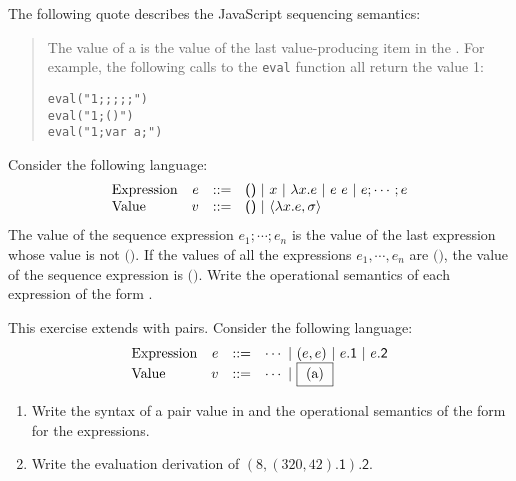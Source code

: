 \begin{exercise}

The following quote describes the JavaScript sequencing semantics:

\begin{quote}
The value of a  is the value of the last
value-producing item in the .  For example, the
following calls to the \verb!eval! function all return the value 1:
\begin{verbatim}
eval("1;;;;;")
eval("1;()")
eval("1;var a;")
\end{verbatim}
\end{quote}
Consider the following language:
\[
  \begin{array}{lrrl}
    \text{Expression} & e & ::= & \textsf{()}\ |\ x\ |\ \efun{x}{e}\ |\ \eapp{e}{e}\ |\
    e;\cdots;e \\
    \text{Value} & v & ::= & \textsf{()}\ |\ \clov{x}{e}{\sigma} \\
  \end{array}
\]
The value of the sequence expression $e_1;\cdots;e_n$
is the value of the last expression whose value is not $\textsf{()}$.
If the values of all the expressions $e_1,\cdots,e_n$ are $\textsf{()}$,
the value of the sequence expression is $\textsf{()}$.
Write the operational semantics of each expression of the form
.

\end{exercise}

\begin{exercise}

This exercise extends \lang with pairs. Consider the following language:
\[
\begin{array}{lrrl}
  \text{Expression}& e & ::= & \cdots\ |\ (e,e)\ |\ e\textsf{.1}\ |\ e\textsf{.2} \\
  \text{Value} & v & ::= & \cdots\ |\ \fbox{ (a) }
\end{array}
\]

\begin{enumerate}
  \item Write the syntax of a pair value in  and
    the operational semantics of the form  for the expressions.
  \item Write the evaluation derivation of
      $(8,(320,42)\textsf{.1})\textsf{.2}$.
\end{enumerate}

\end{exercise}


